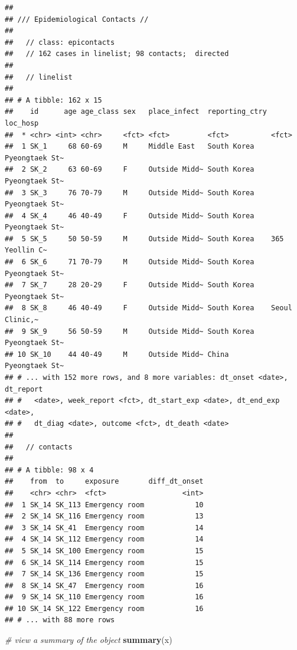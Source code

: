 \documentclass[9pt,a4paper,]{extarticle}
\newenvironment{Shaded}{\begin{snugshade}}{\end{snugshade}}
\newcommand{\KeywordTok}[1]{\textcolor[rgb]{0.13,0.29,0.53}{\textbf{#1}}}
\newcommand{\CommentTok}[1]{\textcolor[rgb]{0.56,0.35,0.01}{\textit{#1}}}
\newcommand{\NormalTok}[1]{#1}
\theoremstyle{definition}
\theoremstyle{definition}
\theoremstyle{definition}
\theoremstyle{remark}
\begin{document}
\begin{verbatim}
## 
## /// Epidemiological Contacts //
## 
##   // class: epicontacts
##   // 162 cases in linelist; 98 contacts;  directed 
## 
##   // linelist
## 
## # A tibble: 162 x 15
##    id      age age_class sex   place_infect  reporting_ctry loc_hosp      
##  * <chr> <int> <chr>     <fct> <fct>         <fct>          <fct>         
##  1 SK_1     68 60-69     M     Middle East   South Korea    Pyeongtaek St~
##  2 SK_2     63 60-69     F     Outside Midd~ South Korea    Pyeongtaek St~
##  3 SK_3     76 70-79     M     Outside Midd~ South Korea    Pyeongtaek St~
##  4 SK_4     46 40-49     F     Outside Midd~ South Korea    Pyeongtaek St~
##  5 SK_5     50 50-59     M     Outside Midd~ South Korea    365 Yeollin C~
##  6 SK_6     71 70-79     M     Outside Midd~ South Korea    Pyeongtaek St~
##  7 SK_7     28 20-29     F     Outside Midd~ South Korea    Pyeongtaek St~
##  8 SK_8     46 40-49     F     Outside Midd~ South Korea    Seoul Clinic,~
##  9 SK_9     56 50-59     M     Outside Midd~ South Korea    Pyeongtaek St~
## 10 SK_10    44 40-49     M     Outside Midd~ China          Pyeongtaek St~
## # ... with 152 more rows, and 8 more variables: dt_onset <date>, dt_report
## #   <date>, week_report <fct>, dt_start_exp <date>, dt_end_exp <date>,
## #   dt_diag <date>, outcome <fct>, dt_death <date>
## 
##   // contacts
## 
## # A tibble: 98 x 4
##    from  to     exposure       diff_dt_onset
##    <chr> <chr>  <fct>                  <int>
##  1 SK_14 SK_113 Emergency room            10
##  2 SK_14 SK_116 Emergency room            13
##  3 SK_14 SK_41  Emergency room            14
##  4 SK_14 SK_112 Emergency room            14
##  5 SK_14 SK_100 Emergency room            15
##  6 SK_14 SK_114 Emergency room            15
##  7 SK_14 SK_136 Emergency room            15
##  8 SK_14 SK_47  Emergency room            16
##  9 SK_14 SK_110 Emergency room            16
## 10 SK_14 SK_122 Emergency room            16
## # ... with 88 more rows
\end{verbatim}

\begin{Shaded}
\begin{Highlighting}[]
\CommentTok{# view a summary of the object                  }
\KeywordTok{summary}\NormalTok{(x)}
\end{Highlighting}
\end{Shaded}
\end{document}
